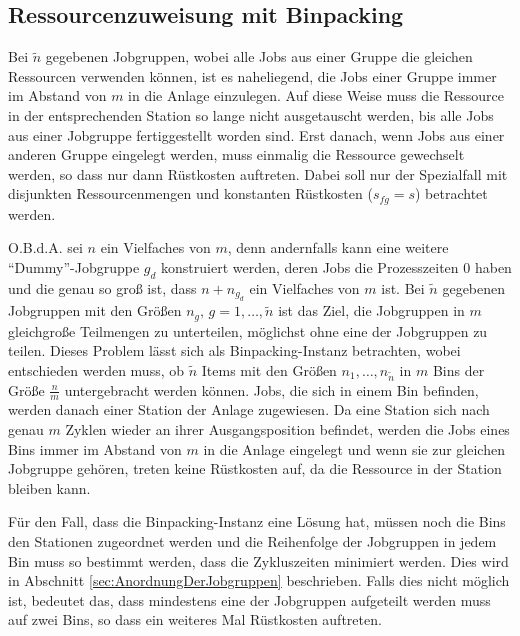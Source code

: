 \documentclass{scrreprt}
\begin{document}

\subsection{Ressourcenzuweisung mit Binpacking}
\label{subsec:RessourcenzuweisungMitBinpacking}
Bei $\tilde{n}$ gegebenen Jobgruppen, wobei alle Jobs aus einer Gruppe die gleichen Ressourcen verwenden können,
ist es naheliegend, die Jobs einer Gruppe immer im Abstand von $m$ in die Anlage einzulegen.
Auf diese Weise muss die Ressource in der entsprechenden Station so lange nicht ausgetauscht werden,
bis alle Jobs aus einer Jobgruppe fertiggestellt worden sind.
Erst danach, wenn Jobs aus einer anderen Gruppe eingelegt werden, muss einmalig die Ressource gewechselt werden,
so dass nur dann Rüstkosten auftreten.
Dabei soll nur der Spezialfall mit disjunkten Ressourcenmengen und konstanten Rüstkosten ($s_{fg}=s$) betrachtet werden.

O.B.d.A. sei $n$ ein Vielfaches von $m$, denn andernfalls kann eine weitere "`Dummy"'-Jobgruppe $g_d$ konstruiert werden,
deren Jobs die Prozesszeiten $0$ haben und die genau so groß ist, dass $n+n_{g_d}$ ein Vielfaches von $m$ ist.
Bei $\tilde{n}$ gegebenen Jobgruppen mit den Größen $n_g, \, g=1,\ldots,\tilde{n}$ ist das Ziel,
die Jobgruppen in $m$ gleichgroße Teilmengen zu unterteilen, möglichst ohne eine der Jobgruppen zu teilen.
Dieses Problem lässt sich als Binpacking-Instanz betrachten, wobei entschieden werden muss, ob $\tilde{n}$ Items 
mit den Größen $n_1,\ldots,n_{\tilde{n}}$ in $m$ Bins der Größe $\frac{n}{m}$ untergebracht werden können.
Jobs, die sich in einem Bin befinden, werden danach einer Station der Anlage zugewiesen.
Da eine Station sich nach genau $m$ Zyklen wieder an ihrer Ausgangsposition befindet,
werden die Jobs eines Bins immer im Abstand von $m$ in die Anlage eingelegt und wenn sie zur gleichen Jobgruppe gehören, treten keine Rüstkosten auf,
da die Ressource in der Station bleiben kann.

Für den Fall, dass die Binpacking-Instanz eine Lösung hat, müssen noch die Bins den Stationen zugeordnet werden und die Reihenfolge
der Jobgruppen in jedem Bin muss so bestimmt werden, dass die Zykluszeiten minimiert werden.
Dies wird in Abschnitt \ref{sec:AnordnungDerJobgruppen} beschrieben.
Falls dies nicht möglich ist, bedeutet das, dass mindestens eine der Jobgruppen aufgeteilt werden muss auf zwei Bins,
so dass ein weiteres Mal Rüstkosten auftreten.
\end{document}
